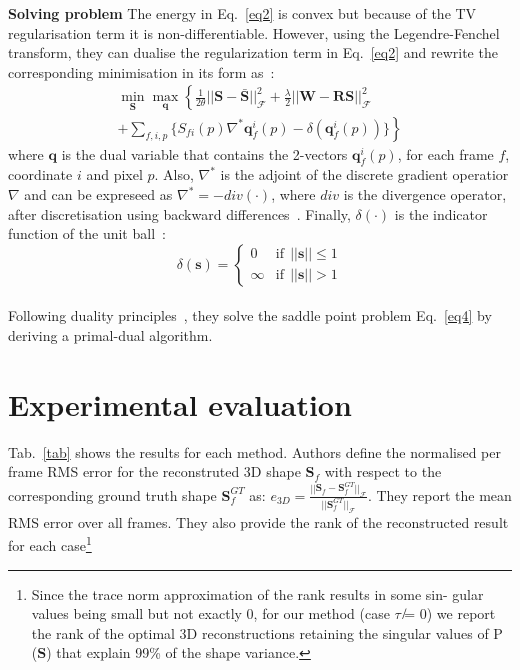 \documentclass[10pt,twocolumn,letterpaper]{article}
\begin{document}
{\bf Solving problem} The energy in Eq.~\ref{eq2} is convex but because of the TV regularisation term it is non-differentiable. However, using the Legendre-Fenchel transform, they can dualise the regularization term in Eq.~\ref{eq2} and rewrite the corresponding minimisation in its form as~\cite{dense}:\\
\begin{equation}
\begin{gathered}
\mathop{\min}\limits_{\mathbf{S}}\mathop{\max}\limits_{\mathbf{q}} \left\{\frac{1}{2\theta}||\mathbf{S} - \bar{\mathbf{S}}||_{\mathcal{F}}^2 + \frac{\lambda}{2}||\mathbf{W} - \mathbf{RS}||_{\mathcal{F}}^2 \right. \\
\left. + \sum_{f,i,p}\{S_{fi}(p)\nabla^{\ast}\mathbf{q}_f^i(p) - \delta(\mathbf{q}_f^i(p))\} \right\}
\label{eq4}
\end{gathered}
\end{equation}
where $\mathbf{q}$ is the dual variable that contains the 2-vectors $\mathbf{q}_f^i(p)$, for each frame $f$, coordinate $i$ and pixel $p$. Also, $\nabla^{\ast}$ is the adjoint of the discrete gradient operatior $\nabla$ and can be expreseed as $\nabla^{\ast} = -div(\cdot)$, where $div$ is the divergence operator, after discretisation using backward differences~\cite{first}. Finally, $\delta(\cdot)$ is the indicator function of the unit ball~\cite{dense}:\\
\[ \delta(\mathbf{s}) = 
\begin{cases}
0 & \text{if}~~||\mathbf{s}||\le 1 \\
\infty & \text{if}~~||\mathbf{s}|| > 1
\tag{5}
\label{eq5}
\end{cases}
\]\\
Following duality principles~\cite{first}, they solve the saddle point problem Eq.~\ref{eq4} by deriving a primal-dual algorithm.

\section{Experimental evaluation}

Tab.~\ref{tab} shows the results for each method. Authors define the normalised per frame RMS error for the reconstruted 3D shape $\mathbf{S}_f$ with respect to the corresponding ground truth shape $\mathbf{S}_f^{GT}$ as: $e_{3D} = \frac{||\mathbf{S}_f - \mathbf{S}_f^{GT}||_{\mathcal{F}}}{||\mathbf{S}_f^{GT}||_{\mathcal{F}}}$. They report the mean RMS error over all frames. They also provide the rank of the reconstructed result for each case\footnote{Since the trace norm approximation of the rank results in some sin- gular values being small but not exactly 0, for our method (case $\tau$ ̸= 0) we report the rank of the optimal 3D reconstructions retaining the singular values of P ($\mathbf{S}$) that explain 99\% of the shape variance.}
\end{document}
